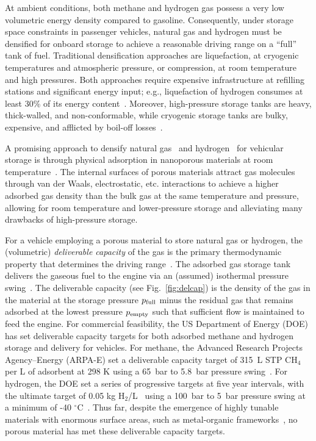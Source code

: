 At ambient conditions, both methane and hydrogen gas possess a very low
volumetric energy density compared to gasoline. Consequently, under storage
space constraints in passenger vehicles, natural gas and hydrogen must be
densified for onboard storage to achieve a reasonable driving range on a
``full'' tank of fuel. Traditional densification approaches are liquefaction,
at cryogenic temperatures and atmospheric pressure, or compression, at room
temperature and high pressures. Both approaches require expensive
infrastructure at refilling stations and significant energy input; e.g.,
liquefaction of hydrogen consumes at least 30\% of its energy
content~\cite{bossel2003energy}. Moreover, high-pressure storage tanks are
heavy, thick-walled, and non-conformable, while cryogenic storage tanks are
bulky, expensive, and afflicted by boil-off losses~\cite{hasan2009minimizing}.

A promising approach to densify natural
gas~\cite{makal2012methane,mason2014evaluating} and
hydrogen~\cite{suh2011hydrogen,garcia2018benchmark} for vehicular storage is
through physical adsorption in nanoporous materials at room
temperature~\cite{schoedel2016role}. The internal surfaces of porous materials
attract gas molecules through van der Waals, electrostatic, etc. interactions
to achieve a higher adsorbed gas density than the bulk gas at the same
temperature and pressure, allowing for room temperature and lower-pressure
storage and alleviating many drawbacks of high-pressure storage.

For a vehicle employing a porous material to store natural gas or hydrogen, the
(volumetric) \emph{deliverable capacity} of the gas is the primary
thermodynamic property that determines the driving
range~\cite{mason2014evaluating}. The adsorbed gas storage tank delivers the
gaseous fuel to the engine via an (assumed) isothermal pressure
swing~\cite{sircar2002pressure}. The deliverable capacity (see
Fig.~\ref{fig:delcap}) is the density of the gas in the material at the storage
pressure $p_{\text{full}}$ minus the residual gas that remains adsorbed at the lowest
pressure $p_{\text{empty}}$ such that sufficient flow is maintained to feed the engine.
For commercial feasibility, the US Department of Energy (DOE) has set
deliverable capacity targets for both adsorbed methane and hydrogen storage and
delivery for vehicles. For methane, the Advanced Research Projects
Agency--Energy (ARPA-E) set a deliverable capacity target of 315\ L STP CH$_4$
per L of adsorbent at 298 K using a 65\ bar to 5.8\ bar pressure
swing~\cite{simon2015materials}. For hydrogen, the DOE set a series of
progressive targets at five year intervals, with the ultimate target of 0.05 kg
H$_2$/L~\cite{h2targetsDOE} using a 100\ bar to 5\ bar pressure swing at a
minimum of -40 $^\circ$C~\cite{allendorf2018assessment}. Thus far, despite the
emergence of highly tunable materials with enormous surface areas, such as
metal-organic frameworks~\cite{furukawa2013chemistry}, no porous material has
met these deliverable capacity targets.

